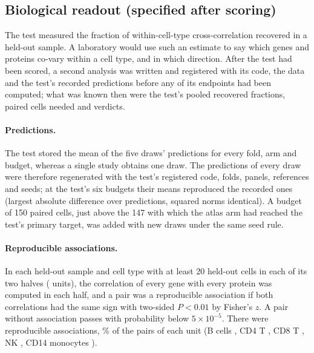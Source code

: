 \begin{table}[h]
\caption{\textbf{Degrees of freedom of the paired draws and calibration of the noise term.} Means over draws and folds. Contrast rows: drawn cells minus populations with a drawn cell. Noise term / variance across draws: over the estimator's blocks along the reference's axes (validation, atlas; bone marrow, other sites) and over folds, the sum of the estimated noise traces of the block means divided by the sum of their variances across draws, each variance divided by $1-B/N$ for $B$ paired cells drawn from a reservoir of $N$; one means calibrated, below one means the noise term is too small. Validation: five draws per budget (prespecified); bone marrow: \DpCalDraws{} fresh draws per budget (after scoring).}
\label{tab:audit}
\centering\footnotesize

\end{table}

\subsection*{Biological readout (specified after scoring)}
The test measured the fraction of within-cell-type cross-correlation recovered in a held-out sample. A laboratory would use such an estimate to say which genes and proteins co-vary within a cell type, and in which direction. After the test had been scored, a second analysis was written and registered with its code, the data and the test's recorded predictions before any of its endpoints had been computed; what was known then were the test's pooled recovered fractions, paired cells needed and verdicts.

\paragraph{Predictions.} The test stored the mean of the five draws' predictions for every fold, arm and budget, whereas a single study obtains one draw. The predictions of every draw were therefore regenerated with the test's registered code, folds, panels, references and seeds; at the test's six budgets their means reproduced the recorded ones (largest absolute difference \BoIntegrity{} over \BoCompared{} predictions, squared norms identical). A budget of 150 paired cells, just above the 147 with which the atlas arm had reached the test's primary target, was added with new draws under the same seed rule.

\paragraph{Reproducible associations.} In each held-out sample and cell type with at least 20 held-out cells in each of its two halves (\BoNUnits{} units), the correlation of every gene with every protein was computed in each half, and a pair was a reproducible association if both correlations had the same sign with two-sided $P<0.01$ by Fisher's $z$. A pair without association passes with probability below $5\times10^{-5}$. There were \BoNRep{} reproducible associations, \BoRepShare\% of the \BoNPairs{} pairs of each unit (B cells \BoRepB, CD4 T \BoRepCDFour, CD8 T \BoRepCDEight, NK \BoRepNK, CD14 monocytes \BoRepMono).

